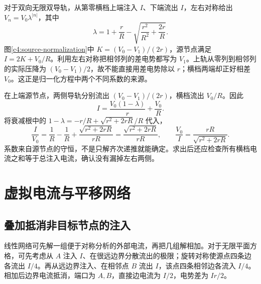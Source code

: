 对于双向无限双导轨，从第零横档上端注入 $I$、下端流出 $I$，左右对称给出 $V_n=V_0\lambda^{|n|}$，其中
\[
 \lambda=1+\frac rR-\sqrt{\frac{r^2}{R^2}+\frac{2r}{R}}.
\]
图\ref{c4:source-normalization}中 $K=(V_0-V_1)/(2r)$，源节点满足 $I=2K+V_0/R$。利用左右对称把相邻列的差电势都写为 $V_1$。上轨从零列到相邻列的实际压降为 $(V_0-V_1)/2$，故不能直接用差电势除以 $r$；横档两端却正好相差 $V_0$。这正是归一化方程中两个不同系数的来源。

在上端源节点，两侧导轨分别流出 $(V_0-V_1)/(2r)$，横档流出 $V_0/R$。因此
\[
 I=\frac{V_0(1-\lambda)}r+\frac{V_0}R.
\]
将衰减根中的 $1-\lambda=-r/R+\sqrt{r^2+2rR}/R$ 代入，
\[
 \frac{I}{V_0}=\frac1R-\frac1R+
 \frac{\sqrt{r^2+2rR}}{rR}
 =\frac{\sqrt{r^2+2rR}}{rR},\qquad
 \frac{V_0}{I}=\frac{rR}{\sqrt{r^2+2rR}}.
\]
系数来自源节点的守恒，不是只解齐次递推就能确定。求出后还应检查所有横档电流之和等于总注入电流，确认没有漏掉左右两侧。


\section{虚拟电流与平移网络}
\subsection{叠加抵消非目标节点的注入}

线性网络可先解一组便于对称分析的外部电流，再把几组解相加。对于无限平面方格，可先考虑从 $A$ 注入 $I$、在很远边界分散流出的极限；旋转对称使源点四条边各流出 $I/4$。再从远边界注入、在相邻点 $B$ 流出 $I$，该点四条相邻边各流入 $I/4$。相加后边界电流抵消，端口为 $A,B$，直接边电流为 $I/2$，电势差为 $Ir/2$。

